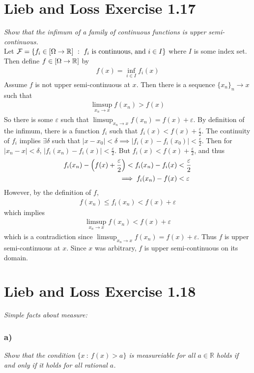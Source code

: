 \documentclass[12pt]{article}
\newcommand{\E}{\varepsilon}
\theoremstyle{plain}
\begin{document}
\section*{Lieb and Loss Exercise 1.17}
\emph{Show that the infimum of a family of continuous functions is upper semi-continuous.} \\

Let $\mathcal{F} = \{f_i \in \qty[\Omega \rightarrow \mathbb{R}]\ :\ f_i \text{ is continuous, and } i \in I\}$ where $I$ is some index set.  Then define $f \in \qty[\Omega \rightarrow \mathbb{R}]$ by
\begin{align*}
    f(x) = \inf_{i \in I}f_i(x)
\end{align*}
Assume $f$ is not upper semi-continuous at $x$.  Then there is a sequence $\{x_n\}_n \rightarrow x$ such that
\begin{align*}
    \limsup_{x_n \rightarrow x} f(x_n) > f(x)
\end{align*}
So there is some $\E$ such that $\limsup_{x_n \rightarrow x}f(x_n) = f(x) + \E$.  By definition of the infimum, there is a function $f_i$ such that $f_i(x) < f(x) + \frac{\E}{2}$.  The continuity of $f_i$ implies $\exists \delta$ such that $|x - x_0| < \delta \implies |f_i(x) - f_i(x_0)| < \frac{\E}{2}$.  Then for $|x_n - x| < \delta$, $|f_i(x_n) - f_i(x)| < \frac{\E}{2}$.  But $f_i(x) < f(x) + \frac{\E}{2}$, and thus
\begin{align*}
    f_i(x_n) - \qty(f(x) + \frac{\E}{2}) < f_i(x_n) - f_i(x) &< \frac{\E}{2} \\
    \implies f_i(x_n) - f(x) &< \E
\end{align*}
However, by the definition of $f$,
\begin{align*}
    f(x_n) \leq f_i(x_n) < f(x) + \E
\end{align*}
which implies
\begin{align*}
    \limsup_{x_n \rightarrow x}f(x_n) < f(x) + \E
\end{align*}
which is a contradiction since $\limsup_{x_n \rightarrow x}f(x_n) = f(x) + \E$.  Thus $f$ is upper semi-continuous at $x$.  Since $x$ was arbitrary, $f$ is upper semi-continuous on its domain.


\section*{Lieb and Loss Exercise 1.18}
\emph{Simple facts about measure:}

\subsubsection*{ a)}
\emph{Show that the condition $\{x\ :\ f(x) > a\}$ is measureiable for all $a \in \mathbb{R}$ holds if and only if it holds for all rational $a$.} \\
\end{document}
